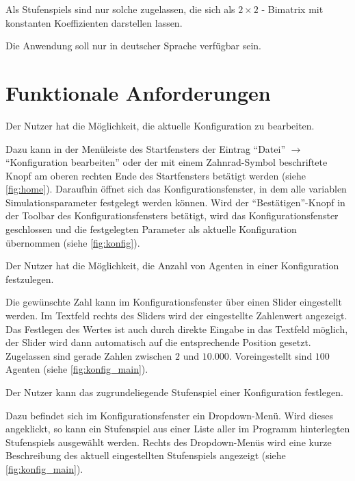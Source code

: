 \documentclass[parskip=full,11pt]{scrartcl}
\begin{document}
Als \Glspl{Stufenspiel} sind nur solche zugelassen, die sich als \(2 \times 2\) - \Gls{Bimatrix} mit konstanten Koeffizienten darstellen lassen.

Die Anwendung soll nur in deutscher Sprache verfügbar sein.

\pagebreak

\section{Funktionale Anforderungen}

Der \Gls{Nutzer} hat die Möglichkeit, die \Gls{aktuelle Konfiguration} zu bearbeiten.

Dazu kann in der Menüleiste des Startfensters der Eintrag \enquote{Datei} \(\rightarrow\) \enquote{\Gls{Konfiguration} bearbeiten} oder der mit einem Zahnrad-Symbol beschriftete Knopf am oberen rechten Ende des Startfensters betätigt werden (siehe \cref{fig:home}). Daraufhin öffnet sich das Konfigurationsfenster, in dem alle variablen Simulationsparameter festgelegt werden können. Wird der \enquote{Bestätigen}-Knopf in der Toolbar des Konfigurationsfensters betätigt, wird das Konfigurationsfenster geschlossen und die festgelegten Parameter als \Gls{aktuelle Konfiguration} übernommen (siehe \cref{fig:konfig}).

Der \Gls{Nutzer} hat die Möglichkeit, die Anzahl von Agenten in einer \Gls{Konfiguration} festzulegen.

Die gewünschte Zahl kann im Konfigurationsfenster über einen Slider eingestellt werden. Im Textfeld rechts des Sliders wird der eingestellte Zahlenwert angezeigt. Das Festlegen des Wertes ist auch durch direkte Eingabe in das Textfeld möglich, der Slider wird dann automatisch auf die entsprechende Position gesetzt. Zugelassen sind gerade Zahlen zwischen \(2\) und \(10.000\). Voreingestellt sind \(100\) Agenten (siehe \cref{fig:konfig_main}).

Der \Gls{Nutzer} kann das zugrundeliegende \Gls{Stufenspiel} einer \Gls{Konfiguration} festlegen.

Dazu befindet sich im Konfigurationsfenster ein Dropdown-Menü. Wird dieses angeklickt, so kann ein \Gls{Stufenspiel} aus einer Liste aller im Programm hinterlegten \Glspl{Stufenspiel} ausgewählt werden. Rechts des Dropdown-Menüs wird eine kurze Beschreibung des aktuell eingestellten \Gls{Stufenspiel}s angezeigt (siehe \cref{fig:konfig_main}).
\end{document}
